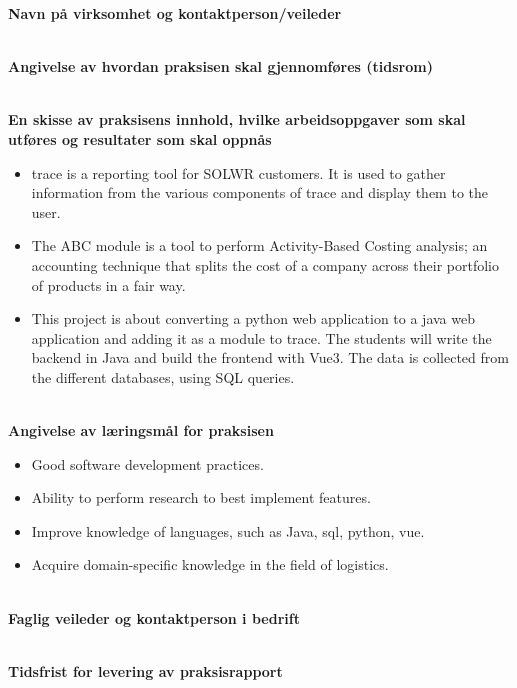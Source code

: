 \quad
\textbf{ Navn på virksomhet og kontaktperson/veileder}

\\

\textbf{Angivelse av hvordan praksisen skal gjennomføres (tidsrom)}

\\

\textbf{En skisse av praksisens innhold, hvilke arbeidsoppgaver som skal utføres og resultater som skal oppnås}

\begin{itemize}
    \item \gls{trace} is a reporting tool for SOLWR customers. It is used to gather information from the various components of \gls{trace} and display them to the user. 
    \item The ABC module is a tool to perform Activity-Based Costing analysis; an accounting technique that splits the cost of a company across their portfolio of products in a fair way. 
    \item This project is about converting a python web application to a java web application and adding it as a module to \gls{trace}. The students will write the backend in Java and build the frontend with Vue3. The data is collected from the different databases, using SQL queries. 
\end{itemize}\\

\textbf{Angivelse av læringsmål for praksisen}

\begin{itemize}
    \item Good software development practices. 
    \item Ability to perform research to best implement features. 
    \item Improve knowledge of languages, such as Java, sql, python, vue. 
    \item Acquire domain-specific knowledge in the field of logistics. 
\end{itemize}\\

\textbf{Faglig veileder og kontaktperson i bedrift}

\\

\textbf{Tidsfrist for levering av praksisrapport}

